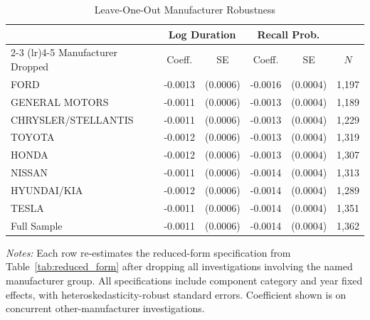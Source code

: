 \begin{table}[htbp]
\centering
\caption{Leave-One-Out Manufacturer Robustness}
\label{tab:loo}
\begin{threeparttable}
\begin{tabular}{lccccc}
\toprule
 & \multicolumn{2}{c}{Log Duration} & \multicolumn{2}{c}{Recall Prob.} & \\
\cmidrule(lr){2-3} \cmidrule(lr){4-5}
Manufacturer Dropped & Coeff. & SE & Coeff. & SE & $N$ \\
\midrule
FORD & -0.0013 & (0.0006) & -0.0016 & (0.0004) & 1,197 \\
GENERAL MOTORS & -0.0011 & (0.0006) & -0.0013 & (0.0004) & 1,189 \\
CHRYSLER/STELLANTIS & -0.0011 & (0.0006) & -0.0013 & (0.0004) & 1,229 \\
TOYOTA & -0.0012 & (0.0006) & -0.0013 & (0.0004) & 1,319 \\
HONDA & -0.0012 & (0.0006) & -0.0013 & (0.0004) & 1,307 \\
NISSAN & -0.0011 & (0.0006) & -0.0014 & (0.0004) & 1,313 \\
HYUNDAI/KIA & -0.0012 & (0.0006) & -0.0014 & (0.0004) & 1,289 \\
TESLA & -0.0011 & (0.0006) & -0.0014 & (0.0004) & 1,351 \\
\midrule
Full Sample & -0.0011 & (0.0006) & -0.0014 & (0.0004) & 1,362 \\
\bottomrule
\end{tabular}
\begin{tablenotes}[flushleft]
\footnotesize
\item \textit{Notes:} Each row re-estimates the reduced-form specification from Table~\ref{tab:reduced_form} after dropping all investigations involving the named manufacturer group. All specifications include component category and year fixed effects, with heteroskedasticity-robust standard errors. Coefficient shown is on concurrent other-manufacturer investigations.
\end{tablenotes}
\end{threeparttable}
\end{table}
